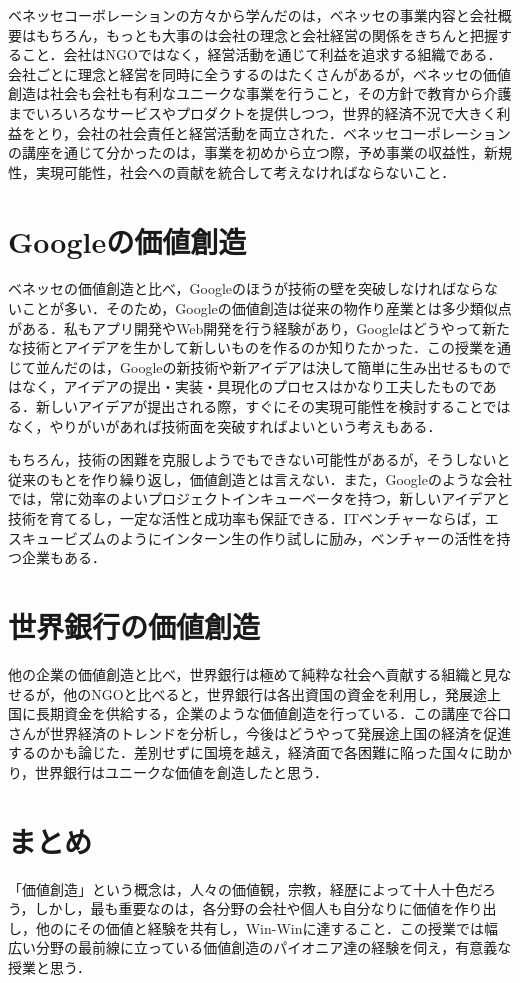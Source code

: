 \documentclass{jsarticle}
\begin{document}
ベネッセコーボレーションの方々から学んだのは，ベネッセの事業内容と会社概要はもちろん，もっとも大事のは会社の理念と会社経営の関係をきちんと把握すること．会社はNGOではなく，経営活動を通じて利益を追求する組織である．会社ごとに理念と経営を同時に全うするのはたくさんがあるが，ベネッセの価値創造は社会も会社も有利なユニークな事業を行うこと，その方針で教育から介護までいろいろなサービスやプロダクトを提供しつつ，世界的経済不況で大きく利益をとり，会社の社会責任と経営活動を両立された．ベネッセコーポレーションの講座を通じて分かったのは，事業を初めから立つ際，予め事業の収益性，新規性，実現可能性，社会への貢献を統合して考えなければならないこと．

\section{Googleの価値創造}

ベネッセの価値創造と比べ，Googleのほうが技術の壁を突破しなければならないことが多い．そのため，Googleの価値創造は従来の物作り産業とは多少類似点がある．私もアプリ開発やWeb開発を行う経験があり，Googleはどうやって新たな技術とアイデアを生かして新しいものを作るのか知りたかった．この授業を通じて並んだのは，Googleの新技術や新アイデアは決して簡単に生み出せるものではなく，アイデアの提出・実装・具現化のプロセスはかなり工夫したものである．新しいアイデアが提出される際，すぐにその実現可能性を検討することではなく，やりがいがあれば技術面を突破すればよいという考えもある．

もちろん，技術の困難を克服しようでもできない可能性があるが，そうしないと従来のもとを作り繰り返し，価値創造とは言えない．また，Googleのような会社では，常に効率のよいプロジェクトインキューベータを持つ，新しいアイデアと技術を育てるし，一定な活性と成功率も保証できる．ITベンチャーならば，エスキュービズムのようにインターン生の作り試しに励み，ベンチャーの活性を持つ企業もある．

\section{世界銀行の価値創造}
他の企業の価値創造と比べ，世界銀行は極めて純粋な社会へ貢献する組織と見なせるが，他のNGOと比べると，世界銀行は各出資国の資金を利用し，発展途上国に長期資金を供給する，企業のような価値創造を行っている．この講座で谷口さんが世界経済のトレンドを分析し，今後はどうやって発展途上国の経済を促進するのかも論じた．差別せずに国境を越え，経済面で各困難に陥った国々に助かり，世界銀行はユニークな価値を創造したと思う．

\section{まとめ}
「価値創造」という概念は，人々の価値観，宗教，経歴によって十人十色だろう，しかし，最も重要なのは，各分野の会社や個人も自分なりに価値を作り出し，他のにその価値と経験を共有し，Win-Winに達すること．この授業では幅広い分野の最前線に立っている価値創造のパイオニア達の経験を伺え，有意義な授業と思う．
\end{document}
